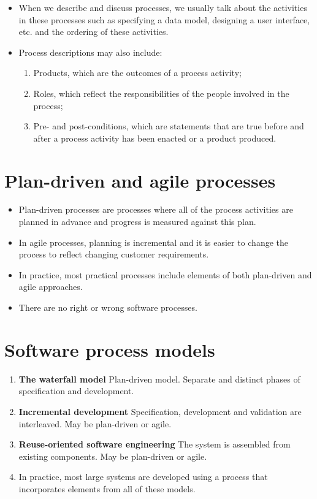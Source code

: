 \begin{itemize}
  \item When we describe and discuss processes, we usually talk about the activities in these processes such as specifying a data model, designing a user interface, etc. and the ordering of these activities.
  \item Process descriptions may also include:
  \begin{enumerate}
    \item Products, which are the outcomes of a process activity;
    \item Roles, which reflect the responsibilities of the people involved in the process;
    \item Pre- and post-conditions, which are statements that are true before and after a process activity has been enacted or a product produced.
  \end{enumerate}

\end{itemize}

\section{Plan-driven and agile processes}

  \begin{itemize}
    \item Plan-driven processes are processes where all of the process activities are planned in advance and progress is measured against this plan.
    \item In agile processes, planning is incremental and it is easier to change the process to reflect changing customer requirements.
    \item In practice, most practical processes include elements of both plan-driven and agile approaches.
    \item There are no right or wrong software processes.
  \end{itemize}

\section{Software process models}
\begin{enumerate}
  \item \textbf{The waterfall model} Plan-driven model. Separate and distinct phases of specification and development.

  \item \textbf{Incremental development} Specification, development and validation are interleaved. May be plan-driven or agile.

  \item \textbf{Reuse-oriented software engineering} The system is assembled from existing components. May be plan-driven or agile.

  \item In practice, most large systems are developed using a process that incorporates elements from all of these models.
\end{enumerate}
\newpage
